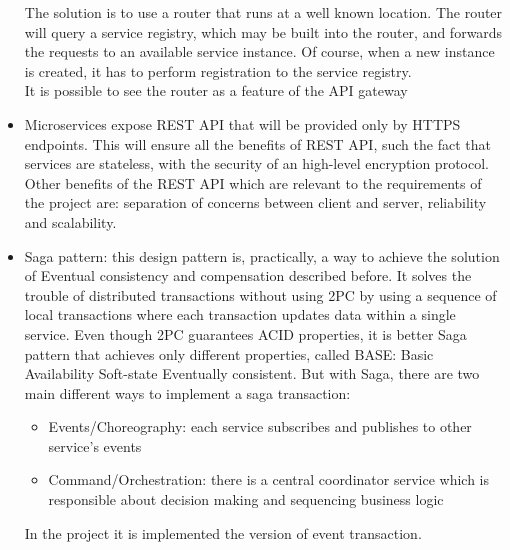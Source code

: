 \begin{itemize}
The solution is to use a router that runs at a well known location. 
The router will query a service registry, which may be built into the
router, and forwards the requests to an available service instance.
Of course, when a new instance is created, it has to perform registration to the service registry. \\
It is possible to see the router as a feature of the API gateway
\item Microservices expose REST API that will be provided only by HTTPS endpoints. This will ensure
all the benefits of REST API, such the fact that services are stateless, with the security of an high-level encryption protocol. Other
benefits of the REST API which are relevant to the requirements of the project are: separation of concerns between client and server, reliability and scalability.
\item Saga pattern: this design pattern is, practically, a way to achieve the solution of Eventual consistency and compensation described before. It solves the trouble of distributed transactions without using 2PC by using a sequence of local transactions where each transaction updates data within a single service. Even though 2PC guarantees ACID properties, it is better Saga pattern that achieves only different properties, called BASE: Basic Availability Soft-state Eventually consistent.  But with Saga, there are two main different ways to implement a saga transaction:
\begin{itemize}
\item Events/Choreography: each service subscribes and publishes to other service's events
\item Command/Orchestration: there is a central coordinator service which is responsible about decision making and sequencing business logic 
\end{itemize}
In the project it is implemented the version of event transaction. 
\end{itemize}